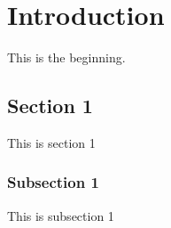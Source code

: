 \chapter{Introduction}\label{ch:introduction}
This is the beginning.

\section{Section 1}\label{sec:section_1}
This is section 1

\subsection{Subsection 1}\label{subsec:subsection_1}
This is subsection 1